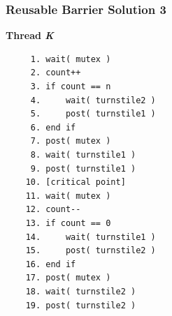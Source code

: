 \begin{frame}[fragile]
	\frametitle{Reusable Barrier Solution 3}
	\vspace{-0.5em}
	\textbf{Thread \textit{K}}\vspace{-0.5em}
	\begin{verbatim}
	 1. wait( mutex )
	 2. count++
	 3. if count == n
	 4.     wait( turnstile2 )
	 5.     post( turnstile1 )
	 6. end if
	 7. post( mutex )
	 8. wait( turnstile1 )
	 9. post( turnstile1 )
	10. [critical point]
	11. wait( mutex )
	12. count--
	13. if count == 0
	14.     wait( turnstile1 )
	15.     post( turnstile2 )
	16. end if
	17. post( mutex )
	18. wait( turnstile2 )
	19. post( turnstile2 )
  \end{verbatim}
	\vspace{-2em}


\end{frame}




